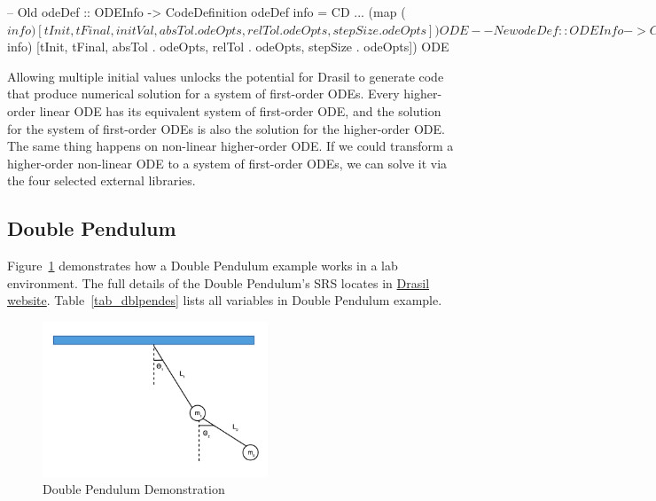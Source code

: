 \begin{listing}
\begin{haskell1}
-- Old 
odeDef :: ODEInfo -> CodeDefinition
odeDef info = CD 
  ...
  (map ($ info) [tInit, tFinal, initVal, absTol . odeOpts, 
  relTol . odeOpts, stepSize . odeOpts]) 
  ODE

-- New 
odeDef :: ODEInfo -> CodeDefinition
odeDef info = CD 
  ...
  (matrix [initVal info]: map ($ info) [tInit, tFinal, absTol . odeOpts, relTol . odeOpts, stepSize . odeOpts])
  ODE
\end{haskell1}
\label{code_odeinfocodedef}
\end{listing}

Allowing multiple initial values unlocks the potential for Drasil to generate code that produce numerical solution for a system of first-order ODEs. Every higher-order linear ODE has its equivalent system of first-order ODE, and the solution for the system of first-order ODEs is also the solution for the higher-order ODE. The same thing happens on non-linear higher-order ODE. If we could transform a higher-order non-linear ODE to a system of first-order ODEs, we can solve it via the four selected external libraries. 

\subsection{Double Pendulum}
\label{se_dblpen}
Figure~\ref{fig_dblpen} demonstrates how a Double Pendulum example works in a lab environment. The full details of the Double Pendulum's SRS locates in \href{https://jacquescarette.github.io/Drasil/examples/dblpendulum/SRS/srs/DblPendulum_SRS.html}{Drasil website}. Table~\ref{tab_dblpendes} lists all variables in Double Pendulum example.
\begin{figure}[ht]
  \centering
  \includegraphics[width=0.6\textwidth]{figures/DblPendulum.png}
  \caption{Double Pendulum Demonstration}
  \label{fig_dblpen}
\end{figure}

